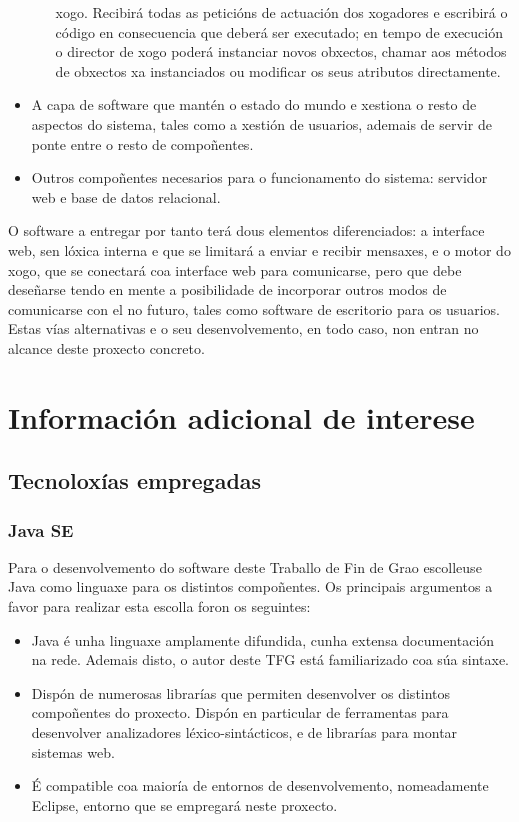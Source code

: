 \begin{itemize}
\begin{itemize}
    xogo. Recibirá todas as peticións de actuación dos xogadores e escribirá o
    código en consecuencia que deberá ser executado; en tempo de execución o 
   director de xogo poderá instanciar novos obxectos, chamar aos métodos de
   obxectos xa instanciados ou modificar os seus atributos directamente.
  \end{itemize}
  \item A capa de software que mantén o estado do mundo e xestiona o resto de
  aspectos do sistema, tales como a xestión de usuarios, ademais de servir de
  ponte entre o resto de compoñentes.
  \item Outros compoñentes necesarios para o funcionamento do sistema: servidor
  web e base de datos relacional.
\end{itemize}
O software a entregar por tanto terá dous elementos diferenciados: a interface
web, sen lóxica interna e que se limitará a enviar e recibir mensaxes, e o
motor do xogo, que se conectará coa interface web para comunicarse, pero que
debe deseñarse tendo en mente a posibilidade de incorporar outros modos de
comunicarse con el no futuro, tales como software de escritorio para os
usuarios. Estas vías alternativas e o seu desenvolvemento, en todo caso, non
entran no alcance deste proxecto concreto.

\section{Información adicional de interese}
\subsection{Tecnoloxías empregadas}

\subsubsection{Java SE}
Para o desenvolvemento do software deste Traballo de Fin de Grao escolleuse Java
como linguaxe para os distintos compoñentes.
Os principais argumentos a favor para realizar esta escolla foron os seguintes:
\begin{itemize}
  \item Java é unha linguaxe amplamente difundida, cunha extensa documentación
  na rede. Ademais disto, o autor deste TFG está familiarizado coa súa sintaxe.
  \item Dispón de numerosas librarías que permiten desenvolver os distintos
  compoñentes do proxecto. Dispón en particular de ferramentas para desenvolver
  analizadores léxico-sintácticos, e de librarías para montar sistemas web.
  \item É compatible coa maioría de entornos de desenvolvemento, nomeadamente
  Eclipse, entorno que se empregará neste proxecto.
\end{itemize}


